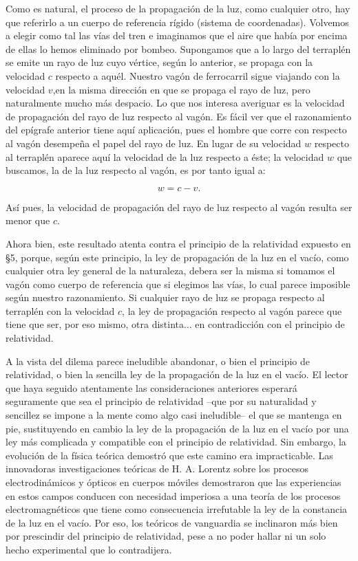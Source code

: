 \documentclass[spanish]{book}
\begin{document}
Como es natural, el proceso de la propagación de la luz, como cualquier otro, hay que
referirlo a un cuerpo de referencia rígido (sistema de coordenadas). Volvemos a elegir
como tal las vías del tren e imaginamos que el aire que había por encima de ellas lo
hemos eliminado por bombeo. Supongamos que a lo largo del terraplén se emite un
rayo de luz cuyo vértice, según lo anterior, se propaga con la velocidad $c$ respecto a
aquél. Nuestro vagón de ferrocarril sigue viajando con la velocidad
$v$,en la misma dirección en que se propaga el rayo de luz, pero naturalmente mucho más despacio.
Lo que nos interesa averiguar es la velocidad de propagación del rayo de luz respecto
al vagón. Es fácil ver que el razonamiento del epígrafe anterior tiene aquí aplicación,
pues el hombre que corre con respecto al vagón desempeña el papel del rayo de luz.
En lugar de su velocidad $w$ respecto al terraplén aparece aquí la velocidad de la luz
respecto a éste; la velocidad $w$ que buscamos, la de la luz respecto al vagón, es por
tanto igual a:

\[w=c-v.\]

Así pues, la velocidad de propagación del rayo de luz respecto al vagón resulta ser
menor que $c$.

Ahora bien, este resultado atenta contra el principio de la relatividad expuesto en \S 5,
porque, según este principio, la ley de propagación de la luz en el vacío, como
cualquier otra ley general de la naturaleza, debera ser la misma si tomamos el vagón
como cuerpo de referencia que si elegimos las vías, lo cual parece imposible según
nuestro razonamiento. Si cualquier rayo de luz se propaga respecto al terraplén con la
velocidad $c$, la ley de propagación respecto al vagón parece que tiene que ser, por eso
mismo, otra distinta... en contradicción con el principio de relatividad.

A la vista del dilema parece ineludible abandonar, o bien el principio de relatividad,
o bien la sencilla ley de la propagación de la luz en el vacío. El lector que haya seguido
atentamente las consideraciones anteriores esperará seguramente que sea el principio
de relatividad --que por su naturalidad y sencillez se impone a la mente como algo casi
ineludible-- el que se mantenga en pie, sustituyendo en cambio la ley de la propagación
de la luz en el vacío por una ley más complicada y compatible con el principio de
relatividad. Sin embargo, la evolución de la física teórica demostró que este camino
era impracticable. Las innovadoras investigaciones teóricas de H. A. Lorentz sobre los
procesos electrodinámicos y ópticos en cuerpos móviles demostraron que las
experiencias en estos campos conducen con necesidad imperiosa a una teoría de los
procesos electromagnéticos que tiene como consecuencia irrefutable la ley de la
constancia de la luz en el vacío. Por eso, los teóricos de vanguardia se inclinaron más
bien por prescindir del principio de relatividad, pese a no poder hallar ni un solo hecho
experimental que lo contradijera.
\end{document}
